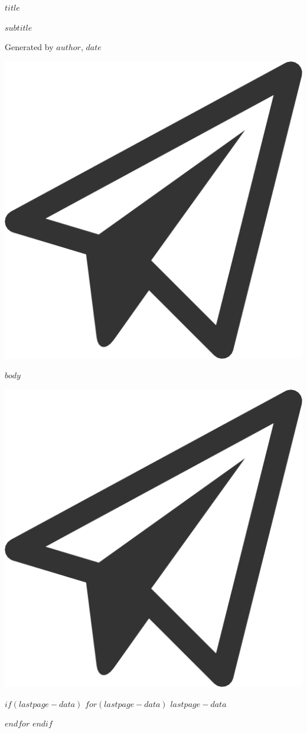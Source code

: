 \documentclass[11pt, letterpaper]{article}
\begin{document}
\pagestyle{fancy}

\begin{titlepage}
	\centering
	
	{%
		\fontsize{30pt}{30pt}\selectfont
		$title$
	}%
	
	\vspace*{\baselineskip}
	{%
		\fontsize{20pt}{20pt}\selectfont
		$subtitle$
	}%
	
	\vspace*{2\baselineskip}
	{\footnotesize Generated by $author$, $date$}
	
	\vspace*{5\baselineskip}
	
	\includegraphics[width=.25\textwidth]{altfund_logo.png}
	
	\vspace*{\baselineskip}
	
	\tableofcontents
	
	\thispagestyle{empty}
\end{titlepage}

\clearpage

\onehalfspacing
\raggedright

$body$

\clearpage

{
	\thispagestyle{empty}
	\centering
	\includegraphics[width=.25\textwidth]{altfund_logo.png}
	\setlength{\parskip}{.5ex}
	
	\vfill

	\footnotesize
	$if(lastpage-data)$
		$for(lastpage-data)$
			$lastpage-data$ \par
		$endfor$
	$endif$
}
\end{document}
